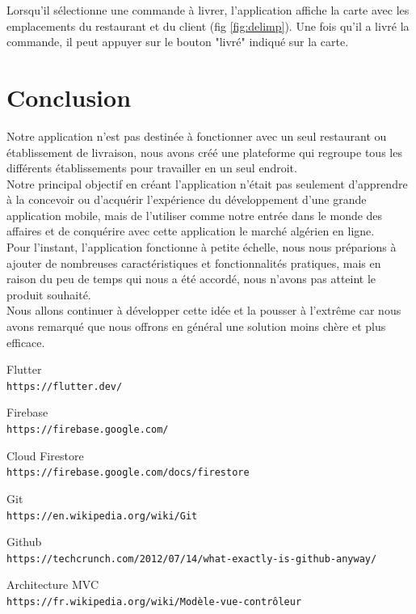\documentclass[french, a4paper, 12pt]{report}
\begin{document}
		Lorsqu'il sélectionne une commande à livrer, l'application affiche la carte avec les emplacements du restaurant et du client (fig \ref{fig:delimp}).
Une fois qu'il a livré la commande, il peut appuyer sur le bouton "livré" indiqué sur la carte.

\newpage
\chapter*{Conclusion}
Notre application n'est pas destinée à fonctionner avec un seul restaurant ou établissement de livraison, nous avons créé une plateforme qui regroupe tous les différents établissements pour travailler en un seul endroit.\\


Notre principal objectif en créant l'application n'était pas seulement d'apprendre à la concevoir ou d'acquérir l'expérience du développement d'une grande application mobile, mais de l'utiliser comme notre entrée dans le monde des affaires et de conquérire avec cette application le marché algérien en ligne.\\


Pour l'instant, l'application fonctionne à petite échelle, nous nous préparions à ajouter de nombreuses caractéristiques et fonctionnalités pratiques, mais en raison du peu de temps qui nous a été accordé, nous n'avons pas atteint le produit souhaité.\\


Nous allons continuer à développer cette idée et la pousser à l'extrême car nous avons remarqué que nous offrons en général une solution moins chère et plus efficace. 


\newpage
\begin{thebibliography}{9}

  Flutter
  \\\texttt{https://flutter.dev/}

  Firebase
  \\\texttt{https://firebase.google.com/}

  Cloud Firestore
  \\\texttt{https://firebase.google.com/docs/firestore}

  Git
  \\\texttt{https://en.wikipedia.org/wiki/Git}

  Github
  \\\texttt{https://techcrunch.com/2012/07/14/what-exactly-is-github-anyway/}

  Architecture MVC
  \\\texttt{https://fr.wikipedia.org/wiki/Modèle-vue-contrôleur}

\end{thebibliography}
\end{document}
